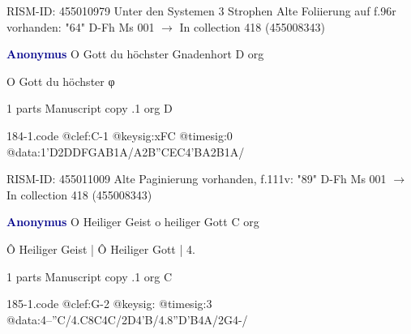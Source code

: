 \documentclass[twocolumn]{book}
\begin{document}
\newline RISM-ID: 455010979
\newline Unter den Systemen 3 Strophen
\newline Alte Foliierung auf f.96r vorhanden: "64"
\newline D-Fh  Ms 001
\newline $\rightarrow$ In collection 418 (455008343)

\newline \par \vspace{7pt} \textcolor{darkblue}{\textbf{Anonymus  }}
\newline O Gott du höchster Gnadenhort  D  
\newline org
\newline \begin{itshape}[f.111v, heading:] O Gott du höchster φ\end{itshape} 
\newline \textcolor{darkblue}{}  1 parts  
\newline Manuscript copy
.1  org  D  
\begin{filecontents*}{184-1.code}
@clef:C-1
@keysig:xFC
@timesig:0
@data:1'D2DDFGAB1A/A2B''CEC4'BA2B1A/
\end{filecontents*}
\newline
%

\newline RISM-ID: 455011009
\newline Alte Paginierung vorhanden, f.111v: "89"
\newline D-Fh  Ms 001
\newline $\rightarrow$ In collection 418 (455008343)

\newline \par \vspace{7pt} \textcolor{darkblue}{\textbf{Anonymus  }}
\newline O Heiliger Geist o heiliger Gott  C  
\newline org
\newline \begin{itshape}[f.4v, at left:] Ô Heiliger Geist | Ô Heiliger Gott | 4.\end{itshape} 
\newline \textcolor{darkblue}{}  1 parts  
\newline Manuscript copy
.1  org  C  
\begin{filecontents*}{185-1.code}
@clef:G-2
@keysig:
@timesig:3
@data:4--''C/4.C8C4C/2D4'B/4.8''D'B4A/2G4-/
\end{filecontents*}
\newline
%
\end{document}
